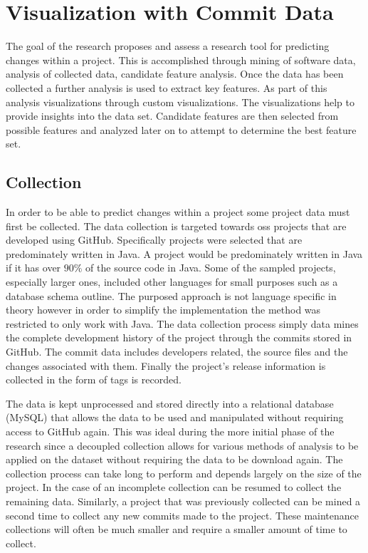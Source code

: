 \chapter{Visualization with Commit Data}
\label{chap:visualization}

The goal of the research proposes and assess a research tool for predicting changes within a project. This is accomplished through mining of software data, analysis of collected data, candidate feature analysis. Once the data has been collected a further analysis is used to extract key features. As part of this analysis visualizations through custom visualizations. The visualizations help to provide insights into the data set. Candidate features are then selected from possible features and analyzed later on to attempt to determine the best feature set.


\section{Collection}
\label{sec:collection}

In order to be able to predict changes within a project some project data must first be collected. The data collection is targeted towards \gls{oss} projects that are developed using GitHub. Specifically projects were selected that are predominately written in Java. A project would be predominately written in Java if it has over $90\%$ of the source code in Java. Some of the sampled projects, especially larger ones, included other languages for small purposes such as a database schema outline. The purposed approach is not language specific in theory however in order to simplify the implementation the method was restricted to only work with Java. The data collection process simply data mines the complete development history of the project through the commits stored in GitHub. The commit data includes developers related, the source files and the changes associated with them. Finally the project's release information is collected in the form of tags is recorded.

The data is kept unprocessed and stored directly into a relational database (MySQL) that allows the data to be used and manipulated without requiring access to GitHub again.  This was ideal during the more initial phase of the research since a decoupled collection allows for various methods of analysis to be applied on the dataset without requiring the data to be download again. The collection process can take long to perform and depends largely on the size of the project. In the case of an incomplete collection can be resumed to collect the remaining data. Similarly, a project that was previously collected can be mined a second time to collect any new commits made to the project. These maintenance collections will often be much smaller and require a smaller amount of time to collect.

